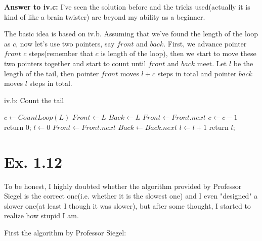\documentclass[a4paper,11pt]{article}
\theoremstyle{mytheor}
\begin{document}
\vspace{1.2in}


\noindent\textbf{Answer to iv.c:} I've seen the solution before and the tricks used(actually it is kind of like a brain twister) are beyond my ability as a beginner.

The basic idea is based on iv.b. Assuming that we've found the length of the loop as $c$, now let's use two pointers, say $front$ and $back$. First, we advance pointer $front$ $c$ steps(remember that $c$ is length of the loop), then we start to move these two pointers together and start to count until $front$ and $back$ meet. Let $l$ be the length of the tail, then pointer $front$ moves $l+c$ steps in total and pointer $back$ moves $l$ steps in total.
\begin{algorithm}[H]
\caption{iv.b: Count the tail}\label{iv.c}
\begin{algorithmic}[1]
  \State $c \gets CountLoop(L)$
  \State $Front \gets L$
  \State $Back \gets L$
    \State $Front \gets Front.next$
    \State $c \gets c-1$
  \EndWhile
    \State return 0;
  \EndIf
  \State $l \gets 0$
    \State $Front \gets Front.next$
    \State $Back \gets Back.next$
    \State $l \gets l+1$
  \EndWhile
  \State return $l$;
\EndProcedure
\end{algorithmic}
\end{algorithm}

\vspace{1.2in}

\section*{Ex. 1.12}
To be honest, I highly doubted whether the algorithm provided by Professor Siegel is the correct one(i.e. whether it is the slowest one) and I even "designed" a slower one(at least I though it was slower), but after some thought, I started to realize how stupid I am.

First the algorithm by Professor Siegel:
\iffalse
\begin{lstlisting}[label={list:eleventh},caption=Pseudo code -- slow Towers of Hanoi.]
procedure SloTh(n, A, B, C);
   input: the n smallest rings start on pole A in sorted order;
   output: the n rings are moved in a legal, complicated pattern that ends with all on B in sorted order and as slow as possible;
   if n equals 1 then:
     move ring 1 from A to C;
     move ring 1 from C to B;
   else:
     SloTh(n - 1, A, B, C); # move ring 1:n-1 from pole A to pole B
     move ring n from A to C;
     SloTh(n - 1, B, A, C); # move ring 1:n-1 from pole B to pole A
     move ring n from C to B;
     SloTh(n - 1, A, B, C); # move ring 1:n-1 from pole A to pole B
   endif
end_ SloTh
\end{lstlisting}
\fi
\end{document}
